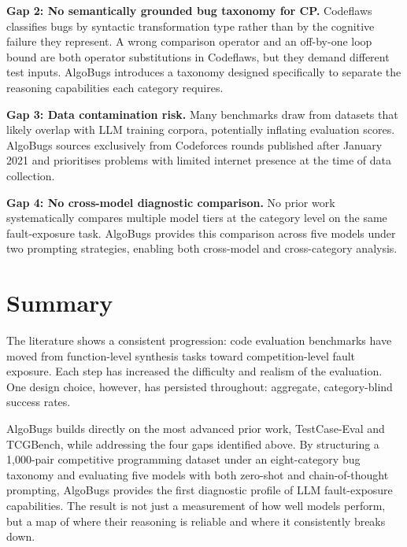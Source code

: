 \textbf{Gap 2: No semantically grounded bug taxonomy for CP.} Codeflaws classifies bugs by syntactic transformation type rather than by the cognitive failure they represent. A wrong comparison operator and an off-by-one loop bound are both operator substitutions in Codeflaws, but they demand different test inputs. AlgoBugs introduces a taxonomy designed specifically to separate the reasoning capabilities each category requires.

\textbf{Gap 3: Data contamination risk.} Many benchmarks draw from datasets that likely overlap with LLM training corpora, potentially inflating evaluation scores. AlgoBugs sources exclusively from Codeforces rounds published after January 2021 and prioritises problems with limited internet presence at the time of data collection.

\textbf{Gap 4: No cross-model diagnostic comparison.} No prior work systematically compares multiple model tiers at the category level on the same fault-exposure task. AlgoBugs provides this comparison across five models under two prompting strategies, enabling both cross-model and cross-category analysis.

\section{Summary}

The literature shows a consistent progression: code evaluation benchmarks have moved from function-level synthesis tasks toward competition-level fault exposure. Each step has increased the difficulty and realism of the evaluation. One design choice, however, has persisted throughout: aggregate, category-blind success rates.

AlgoBugs builds directly on the most advanced prior work, TestCase-Eval and TCGBench, while addressing the four gaps identified above. By structuring a 1,000-pair competitive programming dataset under an eight-category bug taxonomy and evaluating five models with both zero-shot and chain-of-thought prompting, AlgoBugs provides the first diagnostic profile of LLM fault-exposure capabilities. The result is not just a measurement of how well models perform, but a map of where their reasoning is reliable and where it consistently breaks down.
